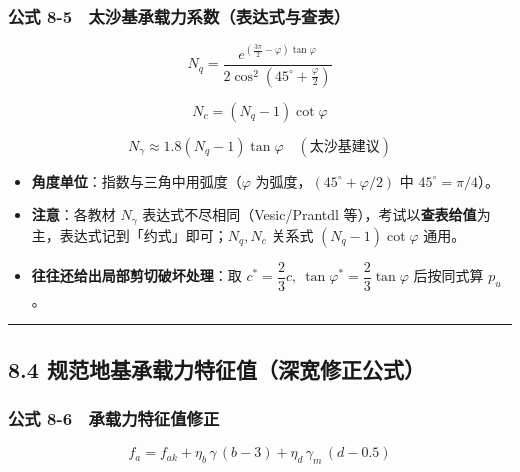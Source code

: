\documentclass[
]{article}
\providecommand{\tightlist}{%
  \setlength{\itemsep}{0pt}\setlength{\parskip}{0pt}}
\begin{document}
\subsubsection{公式
8-5　太沙基承载力系数（表达式与查表）}\label{ux516cux5f0f-8-5-ux592aux6c99ux57faux627fux8f7dux529bux7cfbux6570ux8868ux8fbeux5f0fux4e0eux67e5ux8868}

\[N_q=\frac{e^{\left(\frac{3\pi}{2}-\varphi\right)\tan\varphi}}{2\cos^2\left(45^{\circ}+\frac{\varphi}{2}\right)}\]

\[N_c=\left(N_q-1\right)\cot\varphi\]

\[N_\gamma\approx1.8\left(N_q-1\right)\tan\varphi\quad(\text{太沙基建议})\]

\begin{itemize}
\tightlist
\item
  \textbf{角度单位}：指数与三角中用弧度（\(\varphi\)
  为弧度，\(\left(45^{\circ}+\varphi/2\right)\) 中
  \(45^{\circ}=\pi/4\)）。
\item
  \textbf{注意}：各教材 \(N_\gamma\) 表达式不尽相同（Vesic/Prantdl
  等），考试以\textbf{查表给值}为主，表达式记到「约式」即可；\(N_q,N_c\)
  关系式 \(\left(N_q-1\right)\cot\varphi\) 通用。
\item
  \textbf{往往还给出局部剪切破坏处理}：取
  \(c^*=\dfrac{2}{3}c,\ \tan\varphi^*=\dfrac{2}{3}\tan\varphi\)
  后按同式算 \(p_u\)。
\end{itemize}

\begin{center}\rule{0.5\linewidth}{0.5pt}\end{center}

\subsection{8.4
规范地基承载力特征值（深宽修正公式）}\label{ux89c4ux8303ux5730ux57faux627fux8f7dux529bux7279ux5f81ux503cux6df1ux5bbdux4feeux6b63ux516cux5f0f}

\subsubsection{公式
8-6　承载力特征值修正}\label{ux516cux5f0f-8-6-ux627fux8f7dux529bux7279ux5f81ux503cux4feeux6b63}

\[\boxed{f_a=f_{ak}+\eta_b\,\gamma\,(b-3)+\eta_d\,\gamma_m\,(d-0.5)}\]
\end{document}
